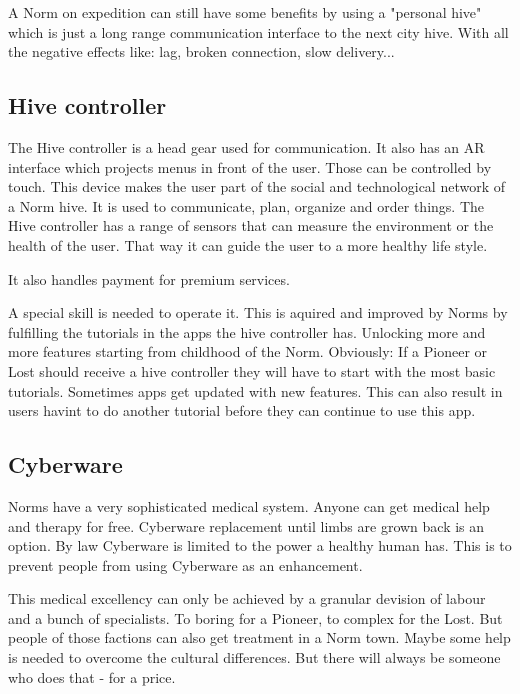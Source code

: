 A Norm on expedition can still have some benefits by using a "personal hive" which is just a long range communication interface to the next city hive. With all the negative effects like: lag, broken connection, slow delivery...

\subsection{Hive controller}
\label{sec:Hive controller}

The Hive controller is a head gear used for communication. It also has an AR interface which projects menus in front of the user. Those can be controlled by touch. This device makes the user part of the social and technological network of a Norm hive.
It is used to communicate, plan, organize and order things.
The Hive controller has a range of sensors that can measure the environment or the health of the user. That way it can guide the user to a more healthy life style.

It also handles payment for premium services.

A special skill is needed to operate it. This is aquired and improved by Norms by fulfilling the tutorials in the apps the hive controller has. Unlocking more and more features starting from childhood of the Norm. Obviously: If a Pioneer or Lost should receive a hive controller they will have to start with the most basic tutorials.
Sometimes apps get updated with new features. This can also result in users havint to do another tutorial before they can continue to use this app.

\subsection{Cyberware}
\label{sec:Cyberware Norm}

Norms have a very sophisticated medical system. Anyone can get medical help and therapy for free. Cyberware replacement until limbs are grown back is an option.
By law Cyberware is limited to the power a healthy human has. This is to prevent people from using Cyberware as an enhancement.

This medical excellency can only be achieved by a granular devision of labour and a bunch of specialists.
To boring for a Pioneer, to complex for the Lost. But people of those factions can also get treatment in a Norm town. Maybe some help is needed to overcome the cultural differences. But there will always be someone who does that - for a price.

